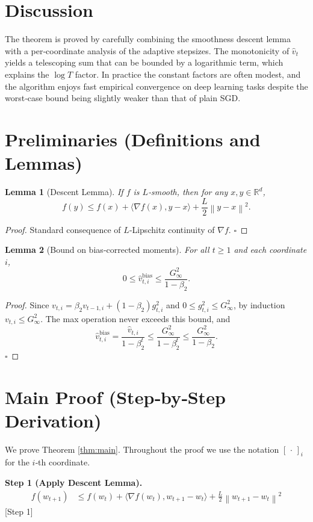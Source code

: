 \documentclass{article}
\newtheorem{lemma}{Lemma}
\newcommand{\R}{\mathbb{R}}
\newcommand{\norm}[1]{\left\|#1\right\|}
\newcommand{\inner}[2]{\langle #1,#2\rangle}
\begin{document}
\section*{Discussion}
The theorem is proved by carefully combining the smoothness descent lemma with a per‑coordinate analysis of the adaptive stepsizes.  The monotonicity of $\hat v_t$ yields a telescoping sum that can be bounded by a logarithmic term, which explains the $\log T$ factor.  In practice the constant factors are often modest, and the algorithm enjoys fast empirical convergence on deep learning tasks despite the worst‑case bound being slightly weaker than that of plain SGD.

\newpage
\section*{Preliminaries (Definitions and Lemmas)}
\begin{lemma}[Descent Lemma]\label{lem:descent}
If $f$ is $L$‑smooth, then for any $x,y\in\R^{d}$,
\[
f(y)\le f(x)+\inner{\nabla f(x)}{y-x}+\frac{L}{2}\norm{y-x}^{2}.
\]
\end{lemma}
\begin{proof}
Standard consequence of $L$‑Lipschitz continuity of $\nabla f$. \hfill $\square$
\end{proof}

\begin{lemma}[Bound on bias‑corrected moments]\label{lem:momentbound}
For all $t\ge 1$ and each coordinate $i$,
\[
0\le \hat v_{t,i}^{\text{bias}} \le \frac{G_{\infty}^{2}}{1-\beta_{2}}.
\]
\end{lemma}
\begin{proof}
Since $v_{t,i}=\beta_{2}v_{t-1,i}+(1-\beta_{2})g_{t,i}^{2}$ and $0\le g_{t,i}^{2}\le G_{\infty}^{2}$,
by induction $v_{t,i}\le G_{\infty}^{2}$.  The max operation never exceeds this bound, and
\[
\hat v_{t,i}^{\text{bias}} = \frac{\hat v_{t,i}}{1-\beta_{2}^{t}}
\le \frac{G_{\infty}^{2}}{1-\beta_{2}^{t}}\le \frac{G_{\infty}^{2}}{1-\beta_{2}}.
\] \hfill $\square$
\end{proof}

\section*{Main Proof (Step‑by‑Step Derivation)}
We prove Theorem \ref{thm:main}.  Throughout the proof we use the notation $[\,\cdot\,]_{i}$ for the $i$‑th coordinate.

\noindent\textbf{Step 1 (Apply Descent Lemma).}
\begin{align}
    f(w_{t+1}) 
    &\le f(w_{t})+\inner{\nabla f(w_{t})}{w_{t+1}-w_{t}}
           +\frac{L}{2}\norm{w_{t+1}-w_{t}}^{2}                                    \tag{1}
\end{align}
[Step 1]
\end{document}
